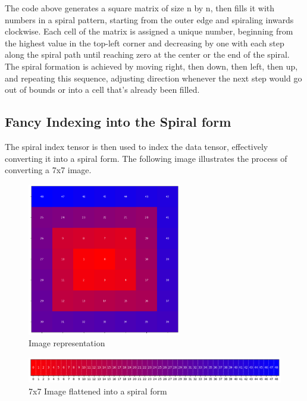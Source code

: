     The code above generates a square matrix of size n by n, then fills it with numbers in a spiral pattern, starting from the outer edge and spiraling inwards clockwise. Each cell of the matrix is assigned a unique number, beginning from the highest value in the top-left corner and decreasing by one with each step along the spiral path until reaching zero at the center or the end of the spiral. The spiral formation is achieved by moving right, then down, then left, then up, and repeating this sequence, adjusting direction whenever the next step would go out of bounds or into a cell that's already been filled.


    \subsection{Fancy Indexing into the Spiral form}

    The spiral index tensor is then used to index the data tensor, effectively converting it into a spiral form. The following image illustrates the process of converting a 7x7 image.
    
    
    \begin{figure}[H]
    \centering
    \includegraphics[width=0.6\textwidth]{../code/dataAnalysis/plots/exampleImgs/spiralShowcase1.png}
    \caption{Image representation}
    \label{fig:spiral_indexing_1}        
    \end{figure}

    \begin{figure}[H]
    \centering
    \includegraphics[width=1\textwidth]{../code/dataAnalysis/plots/exampleImgs/spiralShowcase0.png}
    \caption{7x7 Image flattened into a spiral form} 
    \label{fig:spiral_indexing_0}        
    \end{figure}

